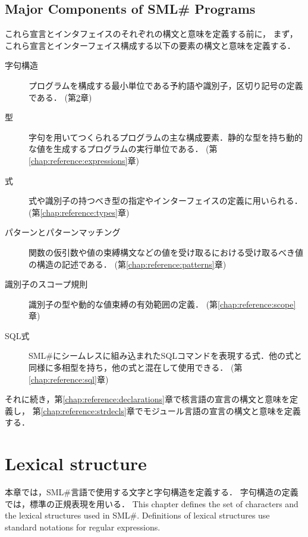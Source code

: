 \documentclass{jbook}
\newcommand{\txt}[2]{#2}
\newcommand{\smlsharp}{SML\#}
\begin{document}
\section{
\txt
{プログラムの主な構成要素}
{Major Components of \smlsharp{} Programs}
}

	これら宣言とインタフェイスのそれぞれの構文と意味を定義する前に，
まず，これら宣言とインターフェイス構成する以下の要素の構文と意味を定義する．
\begin{description}
\item[字句構造] プログラムを構成する最小単位である予約語や識別子，区切り記号の定義である．
(第\ref{chap:reference:lex}章)
\item[型] 字句を用いてつくられるプログラムの主な構成要素．静的な型を持ち動的な値を生成するプログラムの実行単位である．
(第\ref{chap:reference:expressions}章)
\item[式] 式や識別子の持つべき型の指定やインターフェイスの定義に用いられる．
(第\ref{chap:reference:types}章)
\item[パターンとパターンマッチング] 関数の仮引数や値の束縛構文などの値を受け取るにおける受け取るべき値の構造の記述である．
(第\ref{chap:reference:patterns}章)
\item[識別子のスコープ規則] 識別子の型や動的な値束縛の有効範囲の定義．
(第\ref{chap:reference:scope}章)
\item[SQL式] \smlsharp{}にシームレスに組み込まれたSQLコマンドを表現する式．他の式と同様に多相型を持ち，他の式と混在して使用できる．
(第\ref{chap:reference:sql}章)
\end{description}
	それに続き，第\ref{chap:reference:declarations}章で核言語の宣言の構文と意味を定義し，
第\ref{chap:reference:strdecls}章でモジュール言語の宣言の構文と意味を定義する．

\chapter{\txt{字句構造}{Lexical structure}}
\label{chap:reference:lex}

\ifjp%
本章では，\smlsharp{}言語で使用する文字と字句構造を定義する．
字句構造の定義では，標準の正規表現を用いる．
\else%
	This chapter defines the set of characters and the lexical
structures used in \smlsharp{}.
	Definitions of lexical structures use standard
notations for regular expressions.
\fi%
\end{document}
